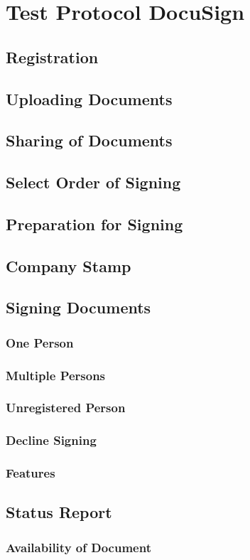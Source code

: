 \section{Test Protocol DocuSign}

\subsection{Registration}

\subsection{Uploading Documents}

\subsection{Sharing of Documents}

\subsection{Select Order of Signing}

\subsection{Preparation for Signing}

\subsection{Company Stamp}

\subsection{Signing Documents}

\subsubsection{One Person}

\subsubsection{Multiple Persons}

\subsubsection{Unregistered Person}

\subsubsection{Decline Signing}

\subsubsection{Features}

\subsection{Status Report}

\subsubsection{Availability of Document}